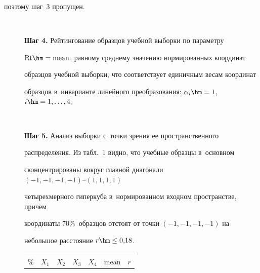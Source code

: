 поэтому {шаг~3} пропущен. 


  \begin{description}


\item[\,]  \textbf{Шаг 4.} Рейтингование образцов учебной выборки по параметру 


$\mathrm{Rt}\hm= \mathrm{mean}$, равному среднему значению нормированных координат 


образцов учебной выборки, что соответствует единичным весам координат 


образцов в~инварианте линейного преобразования: $\alpha_i\hm = 1$, $i\hm = 


1,\ldots , 4$.


  


\item[\,]  \textbf{Шаг 5.} Анализ выборки с~точки зрения ее пространственного 


распределения. Из табл.~1 видно, что учебные образцы в~основном 


сконцентрированы вокруг главной диагонали $(-1, -1, -1, -1)\mbox{--}(1, 1, 1, 1)$ 


четырехмерного гиперкуба в~нормированном входном пространстве, причем 


координаты 70\%~образцов отстоят от точки $(-1, -1, -1, -1)$ на 


небольшое расстояние $r\hm\leq0{,}18$. 





  


\begin{table}[b]\small


\vspace*{-18pt}


\begin{center}




\vspace*{2ex}





\begin{tabular}{|c|c|c|c|c|c|c|}


\hline


&&&&&&\\[-9pt]


\%&$X_1$&$X_2$&$X_3$&$X_4$&mean&$r$\\



\end{tabular}
\end{center}
\end{table}
\end{description}
